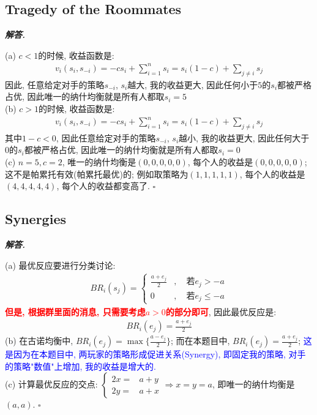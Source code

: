 \documentclass[10pt, a4paper, oneside]{ctexart}
\newenvironment{solution}{%
  \par\noindent\textbf{\textit{解答. }}\ignorespaces
}{%
  \hfill\ensuremath{\square}\par %
}
\begin{document}
\subsection{Tragedy of the Roommates}
\begin{solution}
(a) $c<1$的时候, 收益函数是:
\begin{align*}
    v_i(s_i,s_{-i})=-cs_i+\sum_{i=1}^n s_i = s_i(1-c)+\sum_{j\neq i}s_j
\end{align*}
因此, 任意给定对手的策略$s_{-i}$, $s_i$越大, 我的收益更大, 因此任何小于$5$的$s_i$都被严格占优, 因此唯一的纳什均衡就是所有人都取$s_i=5$\\
(b) $c>1$的时候, 收益函数是:
\begin{align*}
    v_i(s_i,s_{-i})=-cs_i+\sum_{i=1}^n s_i = s_i(1-c)+\sum_{j\neq i}s_j
\end{align*}
其中$1-c<0$, 因此任意给定对手的策略$s_{-i}$, $s_i$越小, 我的收益更大, 因此任何大于$0$的$s_i$都被严格占优, 因此唯一的纳什均衡就是所有人都取$s_i=0$\\
(c) $n=5,c=2$, 唯一的纳什均衡是$(0,0,0,0,0)$, 每个人的收益是$(0,0,0,0,0)$; 这不是帕累托有效(帕累托最优)的; 例如取策略为$(1,1,1,1,1)$, 每个人的收益是$(4,4,4,4,4)$, 每个人的收益都变高了.
\end{solution}

\subsection{Synergies}
\begin{solution}
(a) 最优反应要进行分类讨论:
\begin{align*}
    BR_i(s_j)=\begin{cases}
        \frac{a+e_j}{2}&,\quad \text{若} e_j>-a\\
        0&,\quad \text{若} e_j\leq -a
    \end{cases}
\end{align*}
\textcolor{red}{\textbf{但是, 根据群里面的消息, 只需要考虑$a>0$的部分即可}}, 因此最优反应是:
\begin{align*}
    BR_i(e_j)=\frac{a+e_j}{2}
\end{align*}
(b) 在古诺均衡中, $BR_i(e_j)=\max\{\frac{a-e_j}{2}\}$; 而在本题目中,  $BR_i(e_j)=\frac{a+e_j}{2}$; \textcolor{blue}{这是因为在本题目中, 两玩家的策略形成促进关系(Synergy), 即固定我的策略, 对手的策略"数值"上增加, 我的收益是增大的.}\\
(c) 计算最优反应的交点: $\begin{cases}
    2x=&a+y\\
    2y=&a+x
\end{cases}\Rightarrow x=y=a$, 即唯一的纳什均衡是$(a,a)$.
\end{solution}
\end{document}

